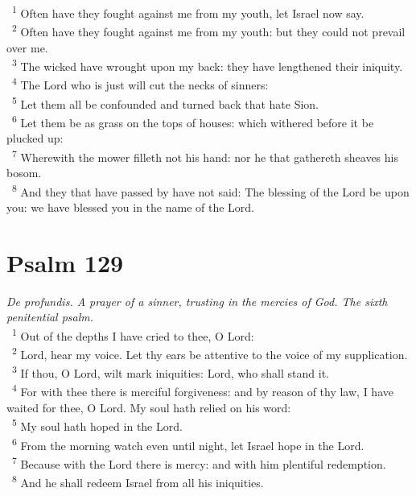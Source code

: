 \documentclass[a5paper,12pt]{article}
\begin{document}
\begin{multicols*}{2}
~\textsuperscript{1} Often have they fought against me from my youth, let Israel now say.\\
~\textsuperscript{2} Often have they fought against me from my youth: but they could not prevail over me.\\
~\textsuperscript{3} The wicked have wrought upon my back: they have lengthened their iniquity.\\
~\textsuperscript{4} The Lord who is just will cut the necks of sinners:\\
~\textsuperscript{5} Let them all be confounded and turned back that hate Sion.\\
~\textsuperscript{6} Let them be as grass on the tops of houses: which withered before it be plucked up:\\
~\textsuperscript{7} Wherewith the mower filleth not his hand: nor he that gathereth sheaves his bosom.\\
~\textsuperscript{8} And they that have passed by have not said: The blessing of the Lord be upon you: we have blessed you in the name of the Lord.\\

\section{Psalm 129}
\label{sec:org6798ef5}
\emph{De profundis. A prayer of a sinner, trusting in the mercies of God. The sixth penitential psalm.}\\

~\textsuperscript{1} Out of the depths I have cried to thee, O Lord:\\
~\textsuperscript{2} Lord, hear my voice. Let thy ears be attentive to the voice of my supplication.\\
~\textsuperscript{3} If thou, O Lord, wilt mark iniquities: Lord, who shall stand it.\\
~\textsuperscript{4} For with thee there is merciful forgiveness: and by reason of thy law, I have waited for thee, O Lord. My soul hath relied on his word:\\
~\textsuperscript{5} My soul hath hoped in the Lord.\\
~\textsuperscript{6} From the morning watch even until night, let Israel hope in the Lord.\\
~\textsuperscript{7} Because with the Lord there is mercy: and with him plentiful redemption.\\
~\textsuperscript{8} And he shall redeem Israel from all his iniquities.\\


\end{multicols*}
\end{document}
